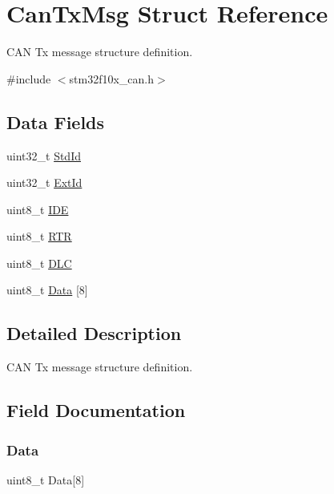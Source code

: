 \hypertarget{struct_can_tx_msg}{}\section{Can\+Tx\+Msg Struct Reference}
\label{struct_can_tx_msg}


C\+AN Tx message structure definition.  




{\ttfamily \#include $<$stm32f10x\+\_\+can.\+h$>$}

\subsection*{Data Fields}
\begin{DoxyCompactItemize}
\item 
uint32\+\_\+t \mbox{\hyperlink{struct_can_tx_msg_a511131786af8d1534273e48ea2052245}{Std\+Id}}
\item 
uint32\+\_\+t \mbox{\hyperlink{struct_can_tx_msg_a8625d2aaf6b0b99f0faf0b8cd07debd4}{Ext\+Id}}
\item 
uint8\+\_\+t \mbox{\hyperlink{struct_can_tx_msg_accecf260a60cf687f0f9898421aeea86}{I\+DE}}
\item 
uint8\+\_\+t \mbox{\hyperlink{struct_can_tx_msg_a131e825d532b66f27dbb74aa80864d37}{R\+TR}}
\item 
uint8\+\_\+t \mbox{\hyperlink{struct_can_tx_msg_a5f86974a53a85fb5706e08f8106296b9}{D\+LC}}
\item 
uint8\+\_\+t \mbox{\hyperlink{struct_can_tx_msg_ab7783127a49388ba2431603e29251b9b}{Data}} \mbox{[}8\mbox{]}
\end{DoxyCompactItemize}


\subsection{Detailed Description}
C\+AN Tx message structure definition. 



\subsection{Field Documentation}
\mbox{\label{struct_can_tx_msg_ab7783127a49388ba2431603e29251b9b}} 
\subsubsection{\texorpdfstring{Data}{Data}}
{\footnotesize\ttfamily uint8\+\_\+t Data\mbox{[}8\mbox{]}}

